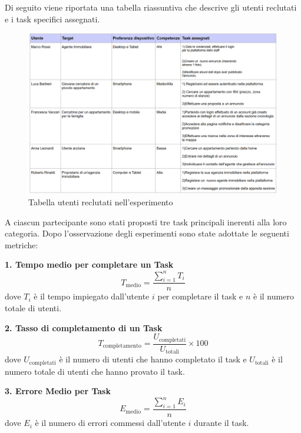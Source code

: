 Di seguito viene riportata una tabella riassuntiva che descrive gli utenti reclutati e i task specifici assegnati.

\begin{figure}[H]
	\centering
	\includegraphics[width=\linewidth]{Immagini/esperimento finale/tabella utenti.png}
	\caption[tabella utenti]{Tabella utenti reclutati nell'esperimento}
\end{figure}

A ciascun partecipante sono stati proposti tre task principali inerenti alla loro categoria. Dopo l'osservazione degli esperimenti sono state adottate le seguenti metriche:

\vspace{0.5cm} %

\textbf{1. Tempo medio per completare un Task}
\begin{equation}
	T_{\text{medio}} = \frac{\sum_{i=1}^{n} T_i}{n}
\end{equation}
dove \( T_i \) è il tempo impiegato dall'utente \( i \) per completare il task e \( n \) è il numero totale di utenti.

\vspace{0.5cm} %
\textbf{2. Tasso di completamento di un Task}
\begin{equation}
	T_{\text{completamento}} = \frac{U_{\text{completati}}}{U_{\text{totali}}} \times 100
\end{equation}
dove \( U_{\text{completati}} \) è il numero di utenti che hanno completato il task e \( U_{\text{totali}} \) è il numero totale di utenti che hanno provato il task.

\vspace{0.5cm} %
\textbf{3. Errore Medio per Task}
\begin{equation}
	E_{\text{medio}} = \frac{\sum_{i=1}^{n} E_i}{n}
\end{equation}
dove \( E_i \) è il numero di errori commessi dall'utente \( i \) durante il task.

